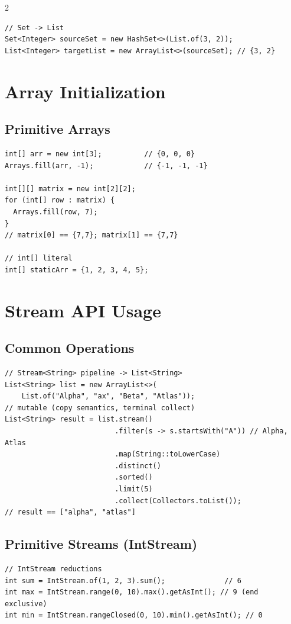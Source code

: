 \documentclass{article}
\begin{document}
\begin{multicols}{2}
\begin{lstlisting}
// Set -> List
Set<Integer> sourceSet = new HashSet<>(List.of(3, 2));
List<Integer> targetList = new ArrayList<>(sourceSet); // {3, 2}
\end{lstlisting}





\columnbreak
\section{Array Initialization}

\subsection{Primitive Arrays}
\begin{lstlisting}
int[] arr = new int[3];          // {0, 0, 0}
Arrays.fill(arr, -1);            // {-1, -1, -1}

int[][] matrix = new int[2][2];
for (int[] row : matrix) {
  Arrays.fill(row, 7);
}
// matrix[0] == {7,7}; matrix[1] == {7,7}

// int[] literal
int[] staticArr = {1, 2, 3, 4, 5};
\end{lstlisting}

\section{Stream API Usage}

\subsection{Common Operations}
\begin{lstlisting}
// Stream<String> pipeline -> List<String>
List<String> list = new ArrayList<>(
    List.of("Alpha", "ax", "Beta", "Atlas"));
// mutable (copy semantics, terminal collect)
List<String> result = list.stream()
                          .filter(s -> s.startsWith("A")) // Alpha, Atlas
                          .map(String::toLowerCase)
                          .distinct()
                          .sorted()
                          .limit(5)
                          .collect(Collectors.toList());
// result == ["alpha", "atlas"]
\end{lstlisting}

\subsection{Primitive Streams (IntStream)}
\begin{lstlisting}
// IntStream reductions
int sum = IntStream.of(1, 2, 3).sum();              // 6
int max = IntStream.range(0, 10).max().getAsInt(); // 9 (end exclusive)
int min = IntStream.rangeClosed(0, 10).min().getAsInt(); // 0


\end{lstlisting}
\end{multicols}
\end{document}
